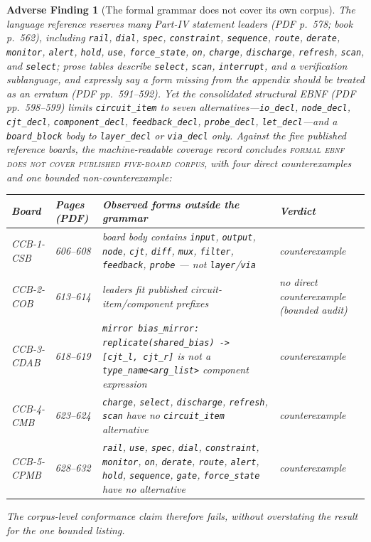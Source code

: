 \documentclass[11pt]{amsart}
\newtheorem{finding}[theorem]{Adverse Finding}
\theoremstyle{definition}
\theoremstyle{remark}
\begin{document}
\begin{finding}[The formal grammar does not cover its own corpus]\label{find:grammar}
The language reference reserves many Part-IV statement leaders (PDF p.~578; book p.~562), including \texttt{rail}, \texttt{dial}, \texttt{spec}, \texttt{constraint}, \texttt{sequence}, \texttt{route}, \texttt{derate}, \texttt{monitor}, \texttt{alert}, \texttt{hold}, \texttt{use}, \texttt{force\_state}, \texttt{on}, \texttt{charge}, \texttt{discharge}, \texttt{refresh}, \texttt{scan}, and \texttt{select}; prose tables describe \texttt{select}, \texttt{scan}, \texttt{interrupt}, and a verification sublanguage, and expressly say a form missing from the appendix should be treated as an erratum (PDF pp.~591--592). Yet the consolidated structural EBNF (PDF pp.~598--599) limits \texttt{circuit\_item} to seven alternatives---\texttt{io\_decl}, \texttt{node\_decl}, \texttt{cjt\_decl}, \texttt{component\_decl}, \texttt{feedback\_decl}, \texttt{probe\_decl}, \texttt{let\_decl}---and a \texttt{board\_block} body to \texttt{layer\_decl} or \texttt{via\_decl} only. Against the five published reference boards, the machine-readable coverage record concludes \textsc{formal ebnf does not cover published five-board corpus}, with four direct counterexamples and one bounded non-counterexample:
\begin{center}
\small
\begin{tabular}{@{}llp{5.6cm}l@{}}
\toprule
Board & Pages (PDF) & Observed forms outside the grammar & Verdict \\
\midrule
CCB-1-CSB & 606--608 & board body contains \texttt{input}, \texttt{output}, \texttt{node}, \texttt{cjt}, \texttt{diff}, \texttt{mux}, \texttt{filter}, \texttt{feedback}, \texttt{probe} --- not \texttt{layer}/\texttt{via} & counterexample \\
CCB-2-COB & 613--614 & leaders fit published circuit-item/component prefixes & no direct counterexample (bounded audit) \\
CCB-3-CDAB & 618--619 & \texttt{mirror bias\_mirror: replicate(shared\_bias) -> [cjt\_l, cjt\_r]} is not a \texttt{type\_name<arg\_list>} component expression & counterexample \\
CCB-4-CMB & 623--624 & \texttt{charge}, \texttt{select}, \texttt{discharge}, \texttt{refresh}, \texttt{scan} have no \texttt{circuit\_item} alternative & counterexample \\
CCB-5-CPMB & 628--632 & \texttt{rail}, \texttt{use}, \texttt{spec}, \texttt{dial}, \texttt{constraint}, \texttt{monitor}, \texttt{on}, \texttt{derate}, \texttt{route}, \texttt{alert}, \texttt{hold}, \texttt{sequence}, \texttt{gate}, \texttt{force\_state} have no alternative & counterexample \\
\bottomrule
\end{tabular}
\end{center}
The corpus-level conformance claim therefore fails, without overstating the result for the one bounded listing.
\end{finding}
\end{document}
